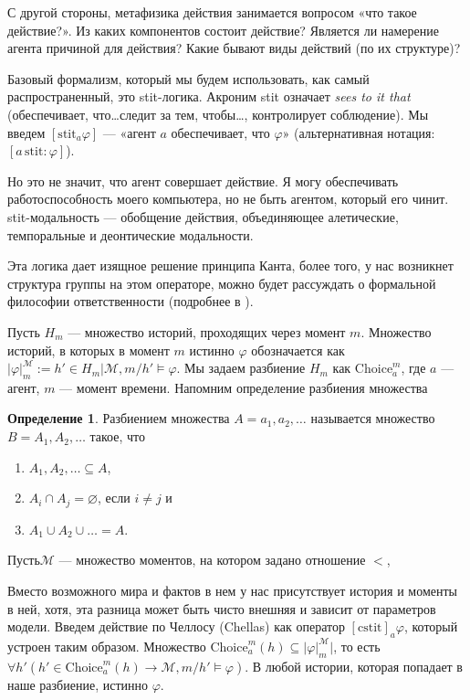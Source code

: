 \documentclass[openany]{book}
\theoremstyle{plain}
\theoremstyle{definition}
\newtheorem{defn}{Определение}[section]
\begin{document}
С другой стороны, метафизика действия занимается вопросом «что такое действие?». Из каких компонентов состоит действие? Является ли намерение агента причиной для действия? Какие бывают виды действий (по их структуре)?

Базовый формализм, который мы будем использовать, как самый распространенный, это stit-логика. Акроним stit означает \textit{sees to it that} (обеспечивает, что\dots следит за тем, чтобы\dots, контролирует соблюдение). Мы введем \([\mathrm{stit}_{a}\varphi]\) --- «агент \(a\) обеспечивает, что \(\varphi\)» (альтернативная нотация: \([a \,\mathrm{stit}: \varphi]\)).

Но это не значит, что агент совершает действие. Я могу обеспечивать работоспособность моего компьютера, но не быть агентом, который его чинит. stit-модальность --- обобщение действия, объединяющее алетические, темпоральные и деонтические модальности. 

Эта логика дает изящное решение принципа Канта, более того, у нас возникнет структура группы на этом операторе, можно будет рассуждать о формальной философии ответственности (подробнее в \cite{Duijf}).

Пусть \(H_m\) --- множество историй, проходящих через момент \(m\). Множество историй, в которых в момент \(m\) истинно \(\varphi\) обозначается как \(|\varphi|_m^{\mathcal{M}} := {h' \in H_m | \mathcal{M}, m/h' \models \varphi}\). Мы задаем разбиение \(H_m\) как \(\mathrm{Choice}_a^m\), где \(a\) --- агент, \(m\) --- момент времени. Напомним определение разбиения множества 
\begin{defn}
Разбиением множества \(A = {a_1, a_2, \dots}\) называется множество \(B = {A_1, A_2, \dots}\) такое, что
\begin{enumerate}
\item \(A_1, A_2, \dots \subseteq A\),
\item \(A_i \cap A_j = \varnothing\), если \(i \not= j\) и
\item \(A_1 \cup A_2 \cup \dots = A\).
\end{enumerate}
\end{defn}

Пусть\(\mathcal{M}\) --- множество моментов, на котором задано отношение \(<\), 

Вместо возможного мира и фактов в нем у нас присутствует история и моменты в ней, хотя, эта разница может быть чисто внешняя и зависит от параметров модели. Введем действие по Челлосу (Chellas) как оператор \([\mathrm{cstit}]_a \varphi\), который устроен таким образом. Множество \(\mathrm{Choice}_a^m (h) \subseteq |\varphi|_m^{\mathcal{M}}|\), то есть \(\forall h' (h' \in \mathrm{Choice}_a^m (h) \to \mathcal{M}, m/h' \models \varphi)\). В любой истории, которая попадает в наше разбиение, истинно \(\varphi\). 
\end{document}
